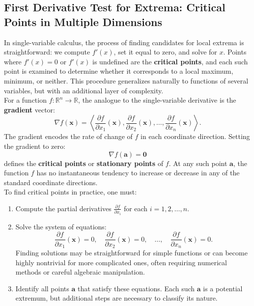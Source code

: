\exampleline

\subsection*{First Derivative Test for Extrema: Critical Points in Multiple Dimensions} 

\noindent In single-variable calculus, the process of finding candidates for local extrema is straightforward: we compute \( f'(x) \), set it equal to zero, and solve for \( x \). Points where \( f'(x)=0 \) or \( f'(x) \) is undefined are the \textbf{critical points}, and each such point is examined to determine whether it corresponds to a local maximum, minimum, or neither. This procedure generalizes naturally to functions of several variables, but with an additional layer of complexity. \\

\noindent For a function \( f: \mathbb{R}^n \to \mathbb{R} \), the analogue to the single-variable derivative is the \textbf{gradient} vector:
\[
\nabla f(\mathbf{x}) = \left\langle \frac{\partial f}{\partial x_1}(\mathbf{x}), \frac{\partial f}{\partial x_2}(\mathbf{x}), \ldots, \frac{\partial f}{\partial x_n}(\mathbf{x}) \right\rangle.
\]
The gradient encodes the rate of change of \( f \) in each coordinate direction. Setting the gradient to zero:
\[
\nabla f(\mathbf{a}) = \mathbf{0}
\]
defines the \textbf{critical points} or \textbf{stationary points} of \( f \). At any such point \(\mathbf{a}\), the function \( f \) has no instantaneous tendency to increase or decrease in any of the standard coordinate directions. \\

To find critical points in practice, one must:
\begin{enumerate}
    \item Compute the partial derivatives \(\frac{\partial f}{\partial x_i}\) for each \( i = 1,2,\ldots,n \).
    \item Solve the system of equations:
    \[
    \frac{\partial f}{\partial x_1}(\mathbf{x})=0, \quad \frac{\partial f}{\partial x_2}(\mathbf{x})=0, \quad \ldots, \quad \frac{\partial f}{\partial x_n}(\mathbf{x})=0.
    \]
    Finding solutions may be straightforward for simple functions or can become highly nontrivial for more complicated ones, often requiring numerical methods or careful algebraic manipulation.

    \item Identify all points \(\mathbf{a}\) that satisfy these equations. Each such \(\mathbf{a}\) is a potential extremum, but additional steps are necessary to classify its nature.
\end{enumerate}

